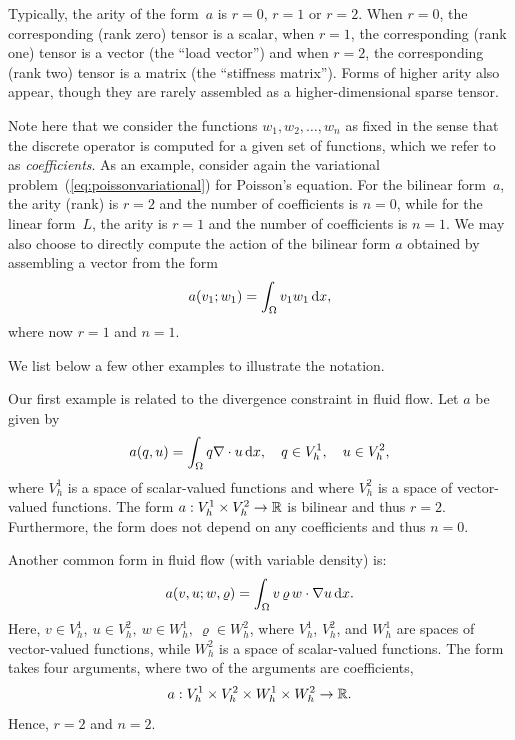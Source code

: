 Typically, the arity of the form~$a$ is $r = 0$, $r = 1$
or $r = 2$. When $r = 0$, the corresponding (rank zero) tensor is a
scalar, when $r = 1$, the corresponding (rank one) tensor is a vector
(the ``load vector'') and when $r = 2$, the corresponding (rank two)
tensor is a matrix (the ``stiffness matrix'').
Forms of higher arity also appear, though they are rarely assembled as
a higher-dimensional sparse tensor.

Note here that we consider the functions $w_1, w_2, \ldots, w_n$ as
fixed in the sense that the discrete operator is computed for a given
set of functions, which we refer to as \emph{coefficients}. As an
example, consider again the variational
problem~(\ref{eq:poissonvariational}) for Poisson's equation. For the
bilinear form~$a$, the arity (rank) is $r = 2$ and the number of
coefficients is $n = 0$, while for the linear form~$L$, the arity is
$r = 1$ and the number of coefficients is $n = 1$. We may also choose
to directly compute the action of the bilinear form $a$ obtained by
assembling a vector from the form
\begin{equation}
  a(v_1; w_1) = \int_{\Omega} v_1 w_1 \, \mathrm{d}x,
\end{equation}
where now $r = 1$ and $n = 1$.

We list below a few other examples to illustrate the notation.

\begin{example}
\label{example:div}
Our first example is related
to the divergence constraint in fluid flow. Let $a$ be given by
\begin{equation}
a(q, u) = \int_{\Omega} q \nabla \cdot u \, \mathrm{d}x, \quad q\in V_h^1, \quad u\in V_h^2, 
\end{equation}
where $V_h^1$ is a space of scalar-valued functions and
where $V_h^2$ is a space of vector-valued functions.
The form $a : V_h^1 \times V_h^2  \rightarrow \mathbb{R}$ is bilinear and
thus $r = 2$. Furthermore, the form does not depend on any
coefficients and thus $n=0$.   
\end{example}

\begin{example}
\label{example:nonlinearconv}
Another common form in fluid flow (with variable density) is: 
\begin{equation}
a(v,u;w,\varrho) = \int_{\Omega} v \, \varrho \, w \cdot \nabla  u \, \mathrm{d}x. 
\end{equation}
Here, $v\in V_h^1,\ u \in V_h^2,\ w\in W_h^1, \ \varrho \in W_h^2$, where
$V_h^1$, $V_h^2$, and $W_h^1$ are spaces of vector-valued functions, while $W_h^2$ is a space of  
scalar-valued functions. 
The form takes four arguments, where two of the arguments
are coefficients,
\begin{equation}
a : V_h^1 \times V_h^2 \times W_h^1 \times W_h^2 \rightarrow \mathbb{R}.
\end{equation}
Hence, $r=2$ and $n=2$. 
\end{example}

